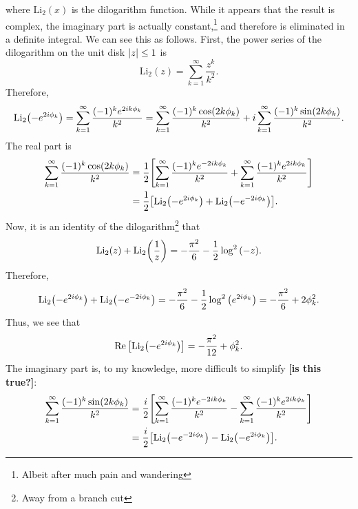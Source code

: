 \documentclass[11pt,twoside,reqno]{amsart}
\theoremstyle{plain}
\theoremstyle{remark}
\theoremstyle{definition}
\theoremstyle{remark}
\theoremstyle{definition}
\theoremstyle{definition}
\renewcommand{\Re}{\operatorname{Re}}
\newcommand{\Li}{\mathrm{Li}}
\begin{document}
	where $\Li_2(x)$ is the dilogarithm function. While it appears that the result is complex, the imaginary part is actually constant,\footnote{Albeit after much pain and wandering} and therefore is eliminated in a definite integral. We can see this as follows. First, the power series of the dilogarithm on the unit disk $\abs{z} \le 1$ is
	\begin{equation}
		\Li_2(z) = \sum_{k = 1}^\infty \frac{z^k}{k^2}.
	\end{equation}
	Therefore,
	\begin{equation}
		\Li_2\qty(-e^{2i\phi_k}) = \sum_{k = 1}^\infty \frac{(-1)^k e^{2ik\phi_k}}{k^2} = \sum_{k = 1}^\infty \frac{(-1)^k \cos(2 k \phi_k)}{k^2} + i \sum_{k = 1}^\infty \frac{(-1)^k \sin(2 k \phi_k)}{k^2}.
	\end{equation}
	The real part is
	\begin{equation}
	\begin{aligned}
		\sum_{k = 1}^\infty \frac{(-1)^k \cos(2 k \phi_k)}{k^2} &= \frac{1}{2}\qty[\sum_{k = 1}^\infty \frac{(-1)^k e^{-2 i k \phi_k}}{k^2} + \sum_{k = 1}^\infty \frac{(-1)^k e^{2 i k \phi_k}}{k^2}]	\\
		&= \frac{1}{2}\qty[\Li_2\qty(-e^{2i\phi_k}) + \Li_2 \qty(-e^{-2i\phi_k})].
	\end{aligned}
	\end{equation}
	Now, it is an identity of the dilogarithm\footnote{Away from a branch cut} that
	\begin{equation}
		\Li_2(z) + \Li_2\qty(\frac{1}{z}) = -\frac{\pi^2}{6} - \frac{1}{2}\log^2\qty(-z).
	\end{equation}
	Therefore,
	\begin{equation}
		\Li_2\qty(-e^{2i\phi_k}) + \Li_2 \qty(-e^{-2i\phi_k}) = -\frac{\pi^2}{6} - \frac{1}{2}\log^2\qty(e^{2i\phi_k}) = -\frac{\pi^2}{6} + 2 \phi_k^2.
	\end{equation}
	Thus, we see that
	\begin{equation}
		\Re\qty[\Li_2\qty(-e^{2i\phi_k})] = -\frac{\pi^2}{12} + \phi_k^2.
	\end{equation}
	The imaginary part is, to my knowledge, more difficult to simplify {\color{red}\textbf{[is this true?]}}:
	\begin{equation}
	\begin{aligned}
		\sum_{k = 1}^\infty \frac{(-1)^k \sin(2 k \phi_k)}{k^2} &= \frac{i}{2}\qty[\sum_{k = 1}^\infty \frac{(-1)^k e^{-2ik\phi_k}}{k^2} - \sum_{k = 1}^\infty \frac{(-1)^k e^{2ik \phi_k}}{k^2}] \\
		&= \frac{i}{2}\qty[\Li_2\qty(-e^{-2i\phi_k}) - \Li_2\qty(-e^{2i\phi_k})].
	\end{aligned}
	\end{equation}
\end{document}
